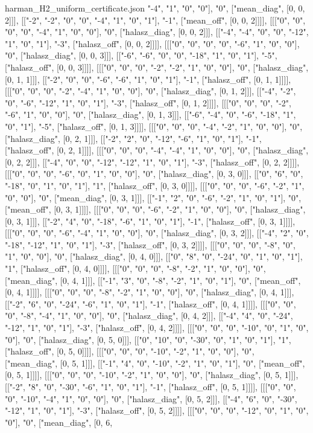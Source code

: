 \begin{filecontents*}[overwrite]{harman_H2_uniform_certificate.json}
"-4", "1", "0", "0"], "0", ["mean_diag", [0, 0, 2]]], [["-2", "-2", "0", "0", "-4", "1", "0", "1"], "-1", ["mean_off", [0, 0, 2]]]], [[["0", "0", "0", "0", "-4", "1", "0", "0"], "0", ["halasz_diag", [0, 0, 2]]], [["-4", "-4", "0", "0", "-12", "1", "0", "1"], "-3", ["halasz_off", [0, 0, 2]]]], [[["0", "0", "0", "0", "-6", "1", "0", "0"], "0", ["halasz_diag", [0, 0, 3]]], [["-6", "-6", "0", "0", "-18", "1", "0", "1"], "-5", ["halasz_off", [0, 0, 3]]]], [[["0", "0", "0", "-2", "-2", "1", "0", "0"], "0", ["halasz_diag", [0, 1, 1]]], [["-2", "0", "0", "-6", "-6", "1", "0", "1"], "-1", ["halasz_off", [0, 1, 1]]]], [[["0", "0", "0", "-2", "-4", "1", "0", "0"], "0", ["halasz_diag", [0, 1, 2]]], [["-4", "-2", "0", "-6", "-12", "1", "0", "1"], "-3", ["halasz_off", [0, 1, 2]]]], [[["0", "0", "0", "-2", "-6", "1", "0", "0"], "0", ["halasz_diag", [0, 1, 3]]], [["-6", "-4", "0", "-6", "-18", "1", "0", "1"], "-5", ["halasz_off", [0, 1, 3]]]], [[["0", "0", "0", "-4", "-2", "1", "0", "0"], "0", ["halasz_diag", [0, 2, 1]]], [["-2", "2", "0", "-12", "-6", "1", "0", "1"], "-1", ["halasz_off", [0, 2, 1]]]], [[["0", "0", "0", "-4", "-4", "1", "0", "0"], "0", ["halasz_diag", [0, 2, 2]]], [["-4", "0", "0", "-12", "-12", "1", "0", "1"], "-3", ["halasz_off", [0, 2, 2]]]], [[["0", "0", "0", "-6", "0", "1", "0", "0"], "0", ["halasz_diag", [0, 3, 0]]], [["0", "6", "0", "-18", "0", "1", "0", "1"], "1", ["halasz_off", [0, 3, 0]]]], [[["0", "0", "0", "-6", "-2", "1", "0", "0"], "0", ["mean_diag", [0, 3, 1]]], [["-1", "2", "0", "-6", "-2", "1", "0", "1"], "0", ["mean_off", [0, 3, 1]]]], [[["0", "0", "0", "-6", "-2", "1", "0", "0"], "0", ["halasz_diag", [0, 3, 1]]], [["-2", "4", "0", "-18", "-6", "1", "0", "1"], "-1", ["halasz_off", [0, 3, 1]]]], [[["0", "0", "0", "-6", "-4", "1", "0", "0"], "0", ["halasz_diag", [0, 3, 2]]], [["-4", "2", "0", "-18", "-12", "1", "0", "1"], "-3", ["halasz_off", [0, 3, 2]]]], [[["0", "0", "0", "-8", "0", "1", "0", "0"], "0", ["halasz_diag", [0, 4, 0]]], [["0", "8", "0", "-24", "0", "1", "0", "1"], "1", ["halasz_off", [0, 4, 0]]]], [[["0", "0", "0", "-8", "-2", "1", "0", "0"], "0", ["mean_diag", [0, 4, 1]]], [["-1", "3", "0", "-8", "-2", "1", "0", "1"], "0", ["mean_off", [0, 4, 1]]]], [[["0", "0", "0", "-8", "-2", "1", "0", "0"], "0", ["halasz_diag", [0, 4, 1]]], [["-2", "6", "0", "-24", "-6", "1", "0", "1"], "-1", ["halasz_off", [0, 4, 1]]]], [[["0", "0", "0", "-8", "-4", "1", "0", "0"], "0", ["halasz_diag", [0, 4, 2]]], [["-4", "4", "0", "-24", "-12", "1", "0", "1"], "-3", ["halasz_off", [0, 4, 2]]]], [[["0", "0", "0", "-10", "0", "1", "0", "0"], "0", ["halasz_diag", [0, 5, 0]]], [["0", "10", "0", "-30", "0", "1", "0", "1"], "1", ["halasz_off", [0, 5, 0]]]], [[["0", "0", "0", "-10", "-2", "1", "0", "0"], "0", ["mean_diag", [0, 5, 1]]], [["-1", "4", "0", "-10", "-2", "1", "0", "1"], "0", ["mean_off", [0, 5, 1]]]], [[["0", "0", "0", "-10", "-2", "1", "0", "0"], "0", ["halasz_diag", [0, 5, 1]]], [["-2", "8", "0", "-30", "-6", "1", "0", "1"], "-1", ["halasz_off", [0, 5, 1]]]], [[["0", "0", "0", "-10", "-4", "1", "0", "0"], "0", ["halasz_diag", [0, 5, 2]]], [["-4", "6", "0", "-30", "-12", "1", "0", "1"], "-3", ["halasz_off", [0, 5, 2]]]], [[["0", "0", "0", "-12", "0", "1", "0", "0"], "0", ["mean_diag", [0, 6, 
\end{filecontents*}
